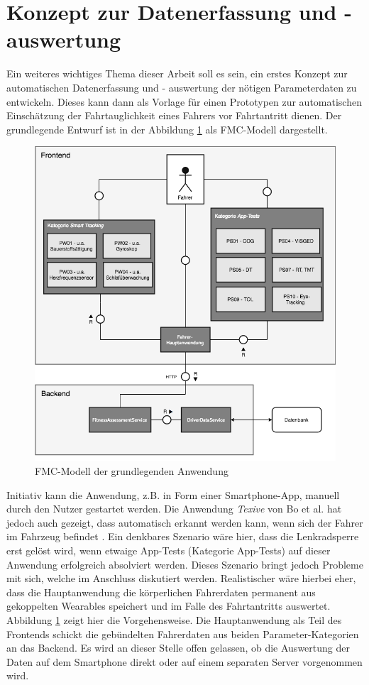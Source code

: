 \section{Konzept zur Datenerfassung und - auswertung}
\label{concept}
Ein weiteres wichtiges Thema dieser Arbeit soll es sein, ein erstes Konzept zur automatischen Datenerfassung und - auswertung der nötigen Parameterdaten zu entwickeln. Dieses kann dann als Vorlage für einen Prototypen zur automatischen Einschätzung der Fahrtauglichkeit eines Fahrers vor Fahrtantritt dienen. Der grundlegende Entwurf ist in der Abbildung \ref{fig:conceptfmc} als FMC-Modell dargestellt.

\begin{figure}
	\centering
	\includegraphics[width=\linewidth]{images/ConceptDriverAssessmentData}
	\caption[Caption for concept]{FMC-Modell der grundlegenden Anwendung}
	\label{fig:conceptfmc}
\end{figure}

Initiativ kann die Anwendung, z.B. in Form einer Smartphone-App, manuell durch den Nutzer gestartet werden. Die Anwendung \textit{Texive} von Bo et al. hat jedoch auch gezeigt, dass automatisch erkannt werden kann, wenn sich der Fahrer im Fahrzeug befindet \cite{texive}. Ein denkbares Szenario wäre hier, dass die Lenkradsperre erst gelöst wird, wenn etwaige App-Tests (Kategorie App-Tests) auf dieser Anwendung erfolgreich absolviert werden. Dieses Szenario bringt jedoch Probleme mit sich, welche im Anschluss diskutiert werden. Realistischer wäre hierbei eher, dass die Hauptanwendung die körperlichen Fahrerdaten permanent aus gekoppelten  Wearables speichert und im Falle des Fahrtantritts auswertet. Abbildung \ref{fig:conceptfmc} zeigt hier die Vorgehensweise. Die Hauptanwendung als Teil des Frontends schickt die gebündelten Fahrerdaten aus beiden Parameter-Kategorien an das Backend. Es wird an dieser Stelle offen gelassen, ob die Auswertung der Daten auf dem Smartphone direkt oder auf einem separaten Server vorgenommen wird.

